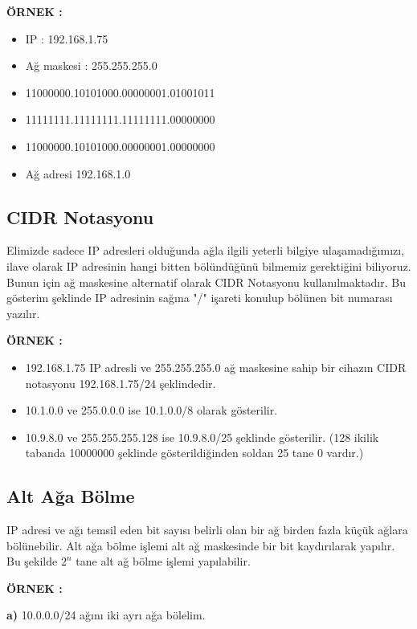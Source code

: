 \textbf{ÖRNEK : }

\begin{itemize}
\item[] IP : 192.168.1.75
\item[] Ağ maskesi : 255.255.255.0
\item[] 11000000.10101000.00000001.01001011
\item[] 11111111.11111111.11111111.00000000
\item[] 11000000.10101000.00000001.00000000
\item[] Ağ adresi 192.168.1.0
\end{itemize} 

\subsection{CIDR Notasyonu}

Elimizde sadece IP adresleri olduğunda ağla ilgili yeterli bilgiye ulaşamadığımızı, ilave olarak IP adresinin hangi bitten bölündüğünü bilmemiz gerektiğini biliyoruz. Bunun için ağ maskesine alternatif olarak CIDR Notasyonu kullanılmaktadır. Bu gösterim şeklinde IP adresinin sağına "/" işareti konulup bölünen bit numarası yazılır. 

\textbf{ÖRNEK : } 

\begin{itemize}
\item[] 192.168.1.75 IP adresli ve 255.255.255.0 ağ maskesine sahip bir cihazın CIDR notasyonu 192.168.1.75/24 şeklindedir. 
\item[] 10.1.0.0 ve 255.0.0.0 ise 10.1.0.0/8 olarak gösterilir. 
\item[] 10.9.8.0 ve 255.255.255.128 ise 10.9.8.0/25 şeklinde gösterilir. (128 ikilik tabanda 10000000 şeklinde gösterildiğinden soldan 25 tane 0 vardır.) 
\end{itemize}

\subsection{Alt Ağa Bölme}
IP adresi ve ağı temsil eden bit sayısı belirli olan bir ağ birden fazla küçük ağlara bölünebilir. Alt ağa bölme işlemi alt ağ maskesinde bir bit kaydırılarak yapılır. Bu şekilde $2^n$ tane alt ağ bölme işlemi yapılabilir. 

\textbf{ÖRNEK : } 

\textbf{a)} 10.0.0.0/24 ağını iki ayrı ağa bölelim.



